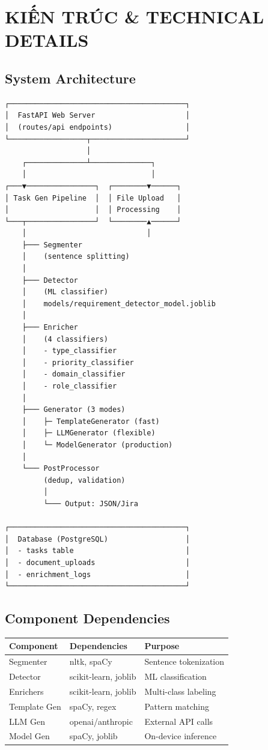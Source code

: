 \documentclass[12pt, a4paper]{report}
\begin{document}
\chapter{KIẾN TRÚC \& TECHNICAL DETAILS}

\section{System Architecture}

\begin{tcolorbox}[colback=gray!5]
\begin{verbatim}
┌─────────────────────────────────────────┐
│  FastAPI Web Server                     │
│  (routes/api endpoints)                 │
└──────────────────┬──────────────────────┘
                   │
    ┌──────────────┴──────────────┐
    │                             │
┌───▼────────────────┐  ┌────────▼──────┐
│ Task Gen Pipeline  │  │ File Upload   │
│                    │  │ Processing    │
└───┬────────────────┘  └────────▲──────┘
    │                            │
    ├─── Segmenter             
    │    (sentence splitting)
    │
    ├─── Detector              
    │    (ML classifier)
    │    models/requirement_detector_model.joblib
    │
    ├─── Enricher              
    │    (4 classifiers)
    │    - type_classifier
    │    - priority_classifier
    │    - domain_classifier
    │    - role_classifier
    │
    ├─── Generator (3 modes)       
    │    ├─ TemplateGenerator (fast)
    │    ├─ LLMGenerator (flexible)
    │    └─ ModelGenerator (production)
    │
    └─── PostProcessor          
         (dedup, validation)
         │
         └─── Output: JSON/Jira

┌─────────────────────────────────────────┐
│  Database (PostgreSQL)                  │
│  - tasks table                          │
│  - document_uploads                     │
│  - enrichment_logs                      │
└─────────────────────────────────────────┘
\end{verbatim}
\end{tcolorbox}

\section{Component Dependencies}

\begin{table}[h]
\centering
\begin{tabular}{|l|p{5cm}|p{3cm}|}
\hline
\textbf{Component} & \textbf{Dependencies} & \textbf{Purpose} \\
\hline
Segmenter & nltk, spaCy & Sentence tokenization \\
\hline
Detector & scikit-learn, joblib & ML classification \\
\hline
Enrichers & scikit-learn, joblib & Multi-class labeling \\
\hline
Template Gen & spaCy, regex & Pattern matching \\
\hline
LLM Gen & openai/anthropic & External API calls \\
\hline
Model Gen & spaCy, joblib & On-device inference \\
\hline
\end{tabular}
\end{table}
\end{document}
